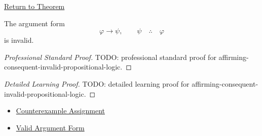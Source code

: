 \newpage
{}
\label{prf:affirming-consequent-invalid-propositional-logic}

\begin{remark*}[Return]
\hyperref[thm:affirming-consequent-invalid-propositional-logic]{Return to Theorem}
\end{remark*}

\begin{theorem*}
The argument form
\[
\varphi\to\psi,\qquad \psi \quad\therefore\quad \varphi
\]
is invalid.
\end{theorem*}

\begin{proof}[Professional Standard Proof]
\LRAProofBodyStart
TODO: professional standard proof for affirming-consequent-invalid-propositional-logic.
\end{proof}

\begin{proof}[Detailed Learning Proof]
\LRAProofBodyStart
TODO: detailed learning proof for affirming-consequent-invalid-propositional-logic.
\end{proof}

\begin{remark*}
\end{remark*}

\begin{dependencies}
\begin{itemize}
  \item \hyperref[def:counterexample-assignment-propositional-logic]{Counterexample Assignment}
  \item \hyperref[def:valid-argument-form-propositional-logic]{Valid Argument Form}
\end{itemize}
\end{dependencies}

\clearpage
